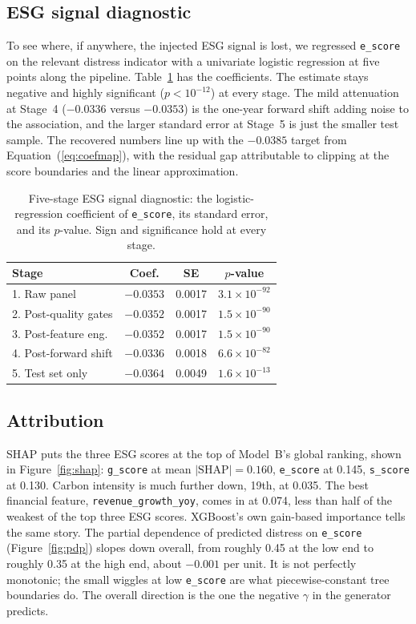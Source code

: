 \documentclass[conference]{IEEEtran}
\newcommand{\code}[1]{\texttt{\small #1}}
\begin{document}
\subsection{ESG signal diagnostic}
\label{sec:diag}
To see where, if anywhere, the injected ESG signal is lost, we regressed
\code{e\_score} on the relevant distress indicator with a univariate logistic
regression at five points along the pipeline. Table~\ref{tab:diag} has the
coefficients. The estimate stays negative and highly significant ($p < 10^{-12}$)
at every stage. The mild attenuation at Stage~4 ($-0.0336$ versus $-0.0353$) is
the one-year forward shift adding noise to the association, and the larger
standard error at Stage~5 is just the smaller test sample. The recovered numbers
line up with the $-0.0385$ target from Equation~(\ref{eq:coefmap}), with the
residual gap attributable to clipping at the score boundaries and the linear
approximation.

\begin{table}[t]
\caption{Five-stage ESG signal diagnostic: the logistic-regression coefficient
of \code{e\_score}, its standard error, and its $p$-value. Sign and significance
hold at every stage.}
\label{tab:diag}
\centering
\renewcommand{\arraystretch}{1.2}
\begin{tabular}{lccc}
\toprule
Stage & Coef. & SE & $p$-value \\
\midrule
1. Raw panel            & $-0.0353$ & 0.0017 & $3.1 \times 10^{-92}$ \\
2. Post-quality gates   & $-0.0352$ & 0.0017 & $1.5 \times 10^{-90}$ \\
3. Post-feature eng.\   & $-0.0352$ & 0.0017 & $1.5 \times 10^{-90}$ \\
4. Post-forward shift   & $-0.0336$ & 0.0018 & $6.6 \times 10^{-82}$ \\
5. Test set only        & $-0.0364$ & 0.0049 & $1.6 \times 10^{-13}$ \\
\bottomrule
\end{tabular}
\end{table}

\subsection{Attribution}
SHAP puts the three ESG scores at the top of Model~B's global ranking, shown in
Figure~\ref{fig:shap}: \code{g\_score} at mean $|\text{SHAP}| = 0.160$,
\code{e\_score} at 0.145, \code{s\_score} at 0.130. Carbon intensity is much
further down, 19th, at 0.035. The best financial feature,
\code{revenue\_growth\_yoy}, comes in at 0.074, less than half of the weakest of
the top three ESG scores. XGBoost's own gain-based importance tells the same
story. The partial dependence of predicted distress on \code{e\_score}
(Figure~\ref{fig:pdp}) slopes down overall, from roughly 0.45 at the low end to
roughly 0.35 at the high end, about $-0.001$ per unit. It is not perfectly
monotonic; the small wiggles at low \code{e\_score} are what piecewise-constant
tree boundaries do. The overall direction is the one the negative $\gamma$ in the
generator predicts.
\end{document}
